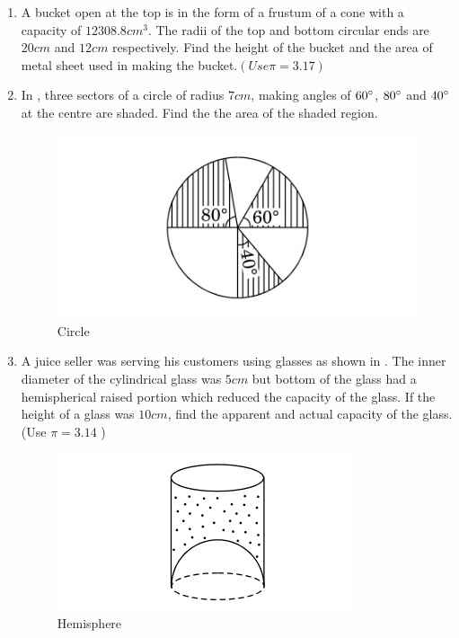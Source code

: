 \begin{enumerate}
\item A bucket open at the top is in the form of a frustum of a cone with a capacity of $12308.8 cm^3 $. The radii of the top and bottom circular ends are $20 cm $ and $12 cm $ respectively. Find the height of the bucket and the area of metal sheet used in making the bucket.$(Use \pi=3.17)$


\item In , three sectors of a circle of radius $7cm$, making angles of $60\degree$,
$80\degree$ and $40\degree$ at the centre are shaded. Find the the area of the shaded region.
\begin{figure}[H]
    \centering
    \includegraphics[width=\columnwidth]{figs/Figure_2.png}
    \caption{Circle}
    \label{fig:figppr-2}
\end{figure}

\item A juice seller was serving his customers using glasses as shown in  . The inner diameter of the cylindrical glass was $5 cm$ but bottom of the glass had a hemispherical raised portion which reduced the capacity of the glass. If the height of a glass was $10 cm$, find the apparent and actual capacity of the glass. (Use $\pi = 3.14$ )
\begin{figure}[H]
    \centering
    \includegraphics[width=\columnwidth]{figs/Figure_3.png}
    \caption{Hemisphere}
    

\end{figure}
\end{enumerate}
